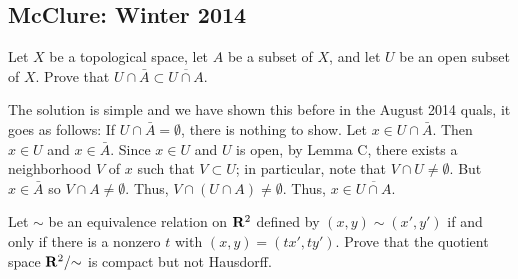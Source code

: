 \subsection{McClure:  Winter 2014}
\setcounter{exercise}{0}
\begin{problem}
  Let $X$ be a topological space, let $A$ be a subset of $X$, and let $U$
  be an open subset of $X$. Prove that
  $U\cap\bar A\subset\overline{U\cap A}$.
\end{problem}
\begin{solution}
  The solution is simple and we have shown this before in the August 2014
  quals, it goes as follows: If $U\cap\bar A=\emptyset$, there is nothing
  to show. Let $x\in U\cap\bar A$. Then $x\in U$ and $x\in\bar A$. Since
  $x\in U$ and $U$ is open, by Lemma C, there exists a neighborhood $V$ of
  $x$ such that $V\subset U$; in particular, note that
  $V\cap U\neq\emptyset$. But $x\in\bar A$ so $V\cap A\neq\emptyset$. Thus,
  $V\cap(U\cap A)\neq\emptyset$. Thus, $x\in\overline{U\cap A}$.
\end{solution}
\begin{problem}
  Let $\sim$ be an equivalence relation on $\mathbf{R}^2$ defined by
  $(x,y)\sim(x',y')$ if and only if there is a nonzero $t$ with
  $(x,y)=(tx',ty')$. Prove that the quotient space $\mathbf{R}^2/{\sim}$ is
  compact but not Hausdorff.
\end{problem}
